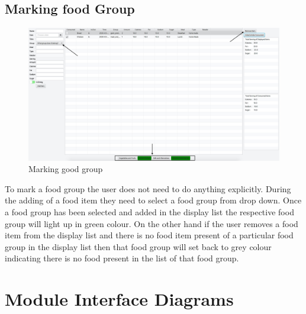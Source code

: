 \documentclass{scrreprt}
\begin{document}
\pagebreak

\subsection{Marking food Group}

\begin{figure}[!htbp]
\centering
\includegraphics[width=15cm]{pictures/food-group.png}
\caption*{Marking good group}
\end{figure}

\FloatBarrier

To mark a food group the user does not need to do anything explicitly. During the adding of a food item they need to select a food group from drop down. Once a food group has been selected and added in the display list the respective food group will light up in green colour. On the other hand if the user removes a food item from the display list and there is no food item present of a particular food group in the display list then that food group will set back to grey colour indicating there is no food present in the list of that food group.

\section{Module Interface Diagrams}

\begin{center}
\end{center}
\end{document}
